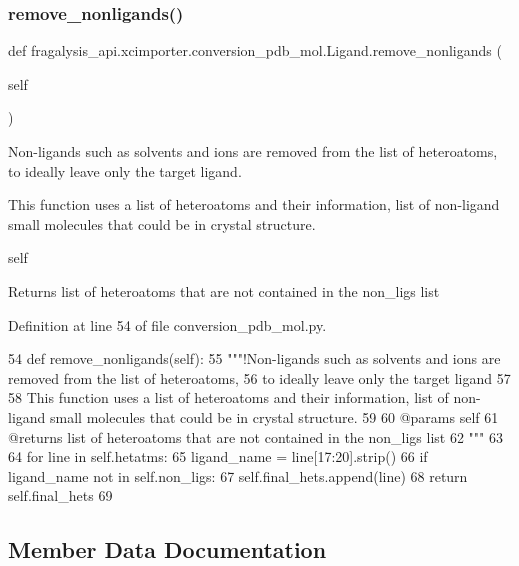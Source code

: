 \subsubsection{\texorpdfstring{remove\+\_\+nonligands()}{remove\_nonligands()}}
{\footnotesize\ttfamily def fragalysis\+\_\+api.\+xcimporter.\+conversion\+\_\+pdb\+\_\+mol.\+Ligand.\+remove\+\_\+nonligands (\begin{DoxyParamCaption}\item[{}]{self }\end{DoxyParamCaption})}



Non-\/ligands such as solvents and ions are removed from the list of heteroatoms, to ideally leave only the target ligand. 

This function uses a list of heteroatoms and their information, list of non-\/ligand small molecules that could be in crystal structure.

self \begin{DoxyReturn}{Returns}
list of heteroatoms that are not contained in the non\+\_\+ligs list 
\end{DoxyReturn}


Definition at line 54 of file conversion\+\_\+pdb\+\_\+mol.\+py.


\begin{DoxyCode}
54     \textcolor{keyword}{def }remove\_nonligands(self):
55         \textcolor{stringliteral}{"""!Non-ligands such as solvents and ions are removed from the list of heteroatoms,}
56 \textcolor{stringliteral}{        to ideally leave only the target ligand}
57 \textcolor{stringliteral}{        }
58 \textcolor{stringliteral}{        This function uses a list of heteroatoms and their information, list of non-ligand small molecules
       that could be in crystal structure.}
59 \textcolor{stringliteral}{}
60 \textcolor{stringliteral}{        @params self  }
61 \textcolor{stringliteral}{        @returns list of heteroatoms that are not contained in the non\_ligs list}
62 \textcolor{stringliteral}{        """}
63 
64         \textcolor{keywordflow}{for} line \textcolor{keywordflow}{in} self.hetatms:
65             ligand\_name = line[17:20].strip()
66             \textcolor{keywordflow}{if} ligand\_name \textcolor{keywordflow}{not} \textcolor{keywordflow}{in} self.non\_ligs:
67                 self.final\_hets.append(line)
68         \textcolor{keywordflow}{return} self.final\_hets
69 
\end{DoxyCode}


\subsection{Member Data Documentation}
\mbox{\label{classfragalysis__api_1_1xcimporter_1_1conversion__pdb__mol_1_1_ligand_ae95cb0d8d1e5783aa0959ce6fe03256b}} 
